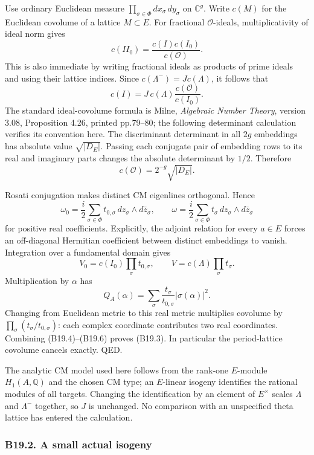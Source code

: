 Use ordinary Euclidean measure \(\prod_{\sigma\in\Phi}dx_\sigma\,dy_\sigma\) on \(\mathbb C^g\). Write \(c(M)\) for the Euclidean covolume of a lattice \(M\subset E\). For fractional \(\mathcal O\)-ideals, multiplicativity of ideal norm gives \[
 c(I I_0)=\frac{c(I)c(I_0)}{c(\mathcal O)}.
\] This is also immediate by writing fractional ideals as products of prime ideals and using their lattice indices. Since \(c(\Lambda^-)=Jc(\Lambda)\), it follows that \[
 c(I)=J\,c(\Lambda)\frac{c(\mathcal O)}{c(I_0)}.
\tag{B19.4}
\] The standard ideal-covolume formula is Milne, \emph{Algebraic Number Theory}, version 3.08, Proposition 4.26, printed pp.79--80; the following determinant calculation verifies its convention here. The discriminant determinant in all \(2g\) embeddings has absolute value \(\sqrt{|D_E|}\). Passing each conjugate pair of embedding rows to its real and imaginary parts changes the absolute determinant by \(1/2\). Therefore \[
 c(\mathcal O)=2^{-g}\sqrt{|D_E|}.
\tag{B19.5}
\]

Rosati conjugation makes distinct CM eigenlines orthogonal. Hence \[
 \omega_0=\frac i2\sum_{\sigma\in\Phi}t_{0,\sigma}\,dz_\sigma\wedge d\bar z_\sigma,
 \qquad
 \omega=\frac i2\sum_{\sigma\in\Phi}t_\sigma\,dz_\sigma\wedge d\bar z_\sigma
\] for positive real coefficients. Explicitly, the adjoint relation for every \(a\in E\) forces an off-diagonal Hermitian coefficient between distinct embeddings to vanish. Integration over a fundamental domain gives \[
 V_0=c(I_0)\prod_\sigma t_{0,\sigma},\qquad
 V=c(\Lambda)\prod_\sigma t_\sigma.
\tag{B19.6}
\] Multiplication by \(\alpha\) has \[
 Q_A(\alpha)=\sum_\sigma\frac{t_\sigma}{t_{0,\sigma}}|\sigma(\alpha)|^2.
\] Changing from Euclidean metric to this real metric multiplies covolume by \(\prod_\sigma(t_\sigma/t_{0,\sigma})\): each complex coordinate contributes two real coordinates. Combining (B19.4)--(B19.6) proves (B19.3). In particular the period-lattice covolume cancels exactly. QED.

The analytic CM model used here follows from the rank-one \(E\)-module \(H_1(A,\mathbb Q)\) and the chosen CM type; an \(E\)-linear isogeny identifies the rational modules of all targets. Changing the identification by an element of \(E^\times\) scales \(\Lambda\) and \(\Lambda^-\) together, so \(J\) is unchanged. No comparison with an unspecified theta lattice has entered the calculation.

\subsubsection{B19.2. A small actual isogeny}\label{b19.2.-a-small-actual-isogeny}

